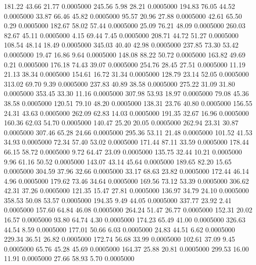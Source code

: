  181.22   43.66   21.77   0.0005000
 245.56    5.98   28.21   0.0005000
 194.83   76.05   44.52   0.0005000
  33.87   66.46   45.82   0.0005000
  95.57   20.96   27.88   0.0005000
  42.61   65.50    0.29   0.0005000
 182.67   58.02   57.44   0.0005000
  25.09   76.21   48.09   0.0005000
 260.03   82.67   45.11   0.0005000
   4.15   69.44    7.45   0.0005000
 208.71   44.72   51.27   0.0005000
 108.54   48.14   18.49   0.0005000
 345.03   40.40   42.98   0.0005000
 237.85   73.30   53.42   0.0005000
  19.47   16.86    9.64   0.0005000
 148.08   88.22   50.72   0.0005000
 163.82   49.69    0.21   0.0005000
 176.18   74.43   39.07   0.0005000
 254.76   28.45   27.51   0.0005000
  11.19   21.13   38.34   0.0005000
 154.61   16.72   31.34   0.0005000
 128.79   23.14   52.05   0.0005000
 313.02   69.70    9.39   0.0005000
 237.83   40.89   38.58   0.0005000
 275.22   31.09   31.80   0.0005000
 353.45   33.30   11.16   0.0005000
 307.98   53.93   18.97   0.0005000
  79.08   45.36   38.58   0.0005000
 120.51   79.10   48.20   0.0005000
 138.31   23.76   40.80   0.0005000
 156.55   24.31   43.63   0.0005000
 262.09   62.83   14.03   0.0005000
 191.35   32.67   16.96   0.0005000
 160.36   62.03   54.70   0.0005000
 140.47   25.20   20.05   0.0005000
 262.94   23.31   30.87   0.0005000
 307.46   65.28   24.66   0.0005000
 295.36   53.11   21.48   0.0005000
 101.52   41.53   34.93   0.0005000
  72.34   57.40   53.02   0.0005000
 171.44   87.11   33.59   0.0005000
 178.44   66.15   58.72   0.0005000
   9.72   64.47   23.09   0.0005000
 135.75   32.44   10.21   0.0005000
   9.96   61.16   50.52   0.0005000
 143.07   43.14   45.64   0.0005000
 189.65   82.20   15.65   0.0005000
 304.59   37.96   32.66   0.0005000
  33.17   68.63   23.82   0.0005000
 172.44   46.14    4.96   0.0005000
 179.62   73.46   34.64   0.0005000
 169.56   73.12   53.39   0.0005000
 306.62   42.31   37.26   0.0005000
 121.35   15.47   27.81   0.0005000
 136.97   34.79   24.10   0.0005000
 358.53   50.08   53.57   0.0005000
 194.35    9.49   44.05   0.0005000
 337.77   23.92    2.41   0.0005000
 157.60   64.84   46.08   0.0005000
 264.24   51.47   26.77   0.0005000
 152.31   20.02   16.57   0.0005000
  93.80   64.74    4.30   0.0005000
 174.23   65.49   41.00   0.0005000
 326.63   44.54    8.59   0.0005000
 177.01   50.66    6.03   0.0005000
  24.83   44.51    6.62   0.0005000
 229.34   36.51   26.82   0.0005000
 172.74   56.68   33.99   0.0005000
 102.61   37.09    9.45   0.0005000
  65.76   45.28   45.69   0.0005000
 164.37   25.88   20.81   0.0005000
 299.53   16.00   11.91   0.0005000
  27.66   58.93    5.70   0.0005000

